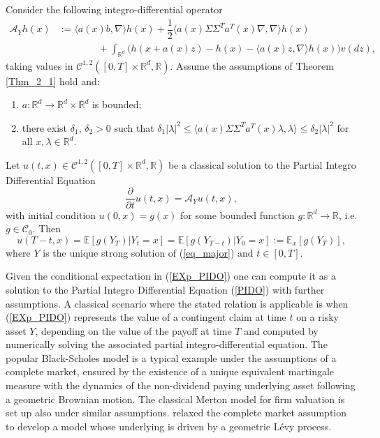 \begin{theorem}\label{Thm4_2} 
Consider the following \break integro-differential operator 
\begin{equation}\label{PIDO}
    \begin{split}
        \mathcal{A}_Y h(x) &:= \langle a(x)b, \nabla \rangle h(x) + \dfrac{1}{2} \langle a(x) \Sigma \Sigma^T a^T(x)  \nabla, \nabla \rangle h(x)\\
        &\qquad\qquad+ \int_{\mathbb{R}^d} \big(h(x + a(x)z) - h(x) - \langle a(x)z, \nabla \rangle h(x)\big) v(dz),
\end{split}
\end{equation}
taking values in $\mathcal{C}^{1,2}([0, T] \times \mathbb{R}^d, \mathbb{R})$. Assume the assumptions  of Theorem \ref{Thm_2_1} hold and:
\begin{enumerate}[label=(\roman*)]
    \item $a : \mathbb{R}^d \to \mathbb{R}^d \times \mathbb{R}^d$ is bounded;
    \item there exist $\delta_1$, $\delta_2>0$ such that $\delta_1|\lambda|^2 \leq \langle a(x) \Sigma \Sigma^T a^T(x)  \lambda, \lambda \rangle  \leq  \delta_2|\lambda|^2 $ for all $x, \lambda \in \mathbb{R}^d$.
\end{enumerate}
Let $u(t, x) \in \mathcal{C}^{1,2}([0, T] \times \mathbb{R}^d, \mathbb{R})$ be a classical solution to the Partial Integro Differential Equation 
\begin{equation}\label{infitesimal}
    \dfrac{\partial}{\partial t}u(t, x) = \mathcal{A}_Y u(t, x),
\end{equation}
with initial condition $u(0, x) = g (x)$ for some bounded function $g:\mathbb{R}^d \to \mathbb{R}$, i.e. $g \in \mathcal{C}_0$. Then
\begin{equation}\label{EXp_PIDO}
    u(T-t, x) = \mathbb{E}[g (Y_T)| Y_t = x] =  \mathbb{E}[g (Y_{T-t})| Y_0 = x] :=  \mathbb{E}_x[g (Y_T)], 
\end{equation}
where $Y$ is the unique strong solution of (\ref{eq_major}) and $t \in [0, T]$.
\end{theorem}
Given the conditional expectation in (\ref{EXp_PIDO}) one can compute it as a solution to the Partial Integro Differential Equation (\ref{PIDO}) with further assumptions. A classical scenario where the stated relation is applicable is when (\ref{EXp_PIDO}) represents the value of a contingent claim at time $t$ on a risky asset $Y$, depending on the value of the payoff at time $T$ and computed by numerically solving the associated partial integro-differential equation. The popular Black-Scholes  model is a typical example under the assumptions of a complete market, ensured by the existence of a unique equivalent martingale measure with the dynamics of the non-dividend paying underlying asset following a geometric Brownian motion. The classical Merton  model for firm valuation is set up also under similar assumptions.  relaxed the complete market assumption to develop a model whose underlying is driven by a geometric L\'evy process.

